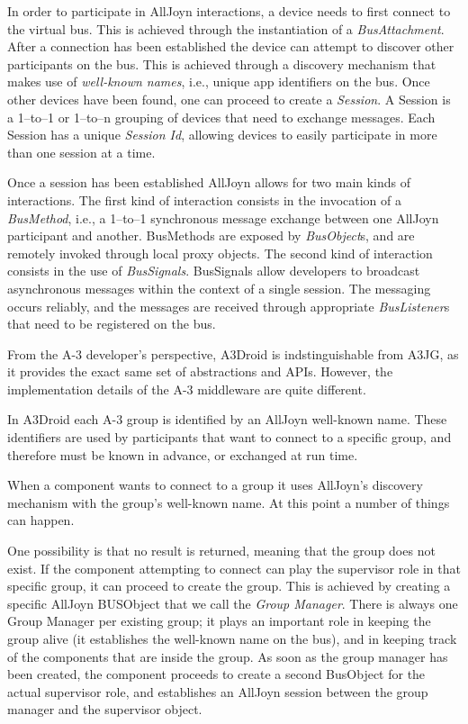 In order to participate in AllJoyn interactions, a device needs to first connect to the virtual bus. This is achieved through the instantiation of a \emph{BusAttachment}. After a connection has been established the device can attempt to discover other participants on the bus. This is achieved through a discovery mechanism that makes use of \emph{well-known names}, i.e., unique app identifiers on the bus. Once other devices have been found, one can proceed to create a \emph{Session}. A Session is a 1--to--1 or 1--to--n grouping of devices that need to exchange messages. Each Session has a unique \emph{Session Id}, allowing devices to easily participate in more than one session at a time.

Once a session has been established AllJoyn allows for two main kinds of interactions. The first kind of interaction consists in the invocation of a \emph{BusMethod}, i.e., a 1--to--1 synchronous message exchange between one AllJoyn participant and another. BusMethods are exposed by \emph{BusObject}s, and are remotely invoked through local proxy objects. The second kind of interaction consists in the use of \emph{BusSignals}. BusSignals allow developers to broadcast asynchronous messages within the context of a single session. The messaging occurs reliably, and the messages are received through appropriate \emph{BusListener}s that need to be registered on the bus. 

From the A-3 developer's perspective, A3Droid is indstinguishable from A3JG, as it provides the exact same set of abstractions and APIs. However, the implementation details of the A-3 middleware are quite different.

In A3Droid each A-3 group is identified by an AllJoyn well-known name. These identifiers are used by participants that want to connect to a specific group, and therefore must be known in advance, or exchanged at run time. 

When a component wants to connect to a group it uses AllJoyn's discovery mechanism with the group's well-known name. At this point a number of things can happen. 

One possibility is that no result is returned, meaning that the group does not exist. If the component attempting to connect can play the supervisor role in that specific group, it can proceed to create the group. This is achieved by creating a specific AllJoyn BUSObject that we call the \emph{Group Manager}. There is always one Group Manager per existing group; it plays an important role in keeping the group alive (it establishes the well-known name on the bus), and in keeping track of the components that are inside the group. As soon as the group manager has been created, the component proceeds to create a second BusObject for the actual supervisor role, and establishes an AllJoyn session between the group manager and the supervisor object. 

